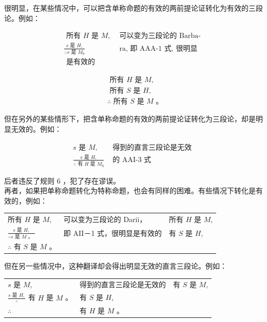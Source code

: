 很明显，在某些情况中，可以把含单称命题的有效的两前提论证转化为有效的三段论。例如：

$$
\begin{array}{ll}
\text { 所有 } H \text { 是 } M, & \text { 可以变为三段论的 Barba- } \\
\frac{s \text { 是 } H,}{\therefore s \text { 是 } M_{0}} & \text { ra, 即 AAA-1 式, 很明显 } \\
\text { 是有效的 } &
\end{array}
$$

$$
\begin{aligned}
& \text { 所有 } H \text { 是 } M, \\
& \text { 所有 } S \text { 是 } H, \\
& \therefore \text { 所有 } S \text { 是 } M \text { 。 }
\end{aligned}
$$

但在另外的某些情形下，把含单称命题的有效的两前提论证转化为三段论，却是明显无效的。例如：

$$
\begin{array}{ll}
s \text { 是 } M, & \text { 得到的直言三段论是无效 } \\
\frac{s \text { 是 } H,}{\therefore \text { 有 } H \text { 是 } M_{0}} & \text { 的 AAI-3 式 }
\end{array}
$$

后者违反了规则 6 ，犯了存在谬误。\\
再者，如果把单称命题转化为特称命题，也会有同样的困难。有些情况下转化是有效的，例如：

\begin{center}
\begin{tabular}{lll}
所有 $H$ 是 $M$, & 可以变为三段论的 Darii， & 所有 $H$ 是 $M$, \\
$\frac{s \text { 是 } H,}{\therefore s \text { 是 } M \text { 。 }}$ & 即 AII－1 式，很明显是有效的 & 有 $S$ 是 $H$, \\
$\therefore$ 有 $S$ 是 $M$ 。 &  &  \\
\end{tabular}
\end{center}

但在另一些情况中，这种翻译却会得出明显无效的直言三段论。例如：

\begin{center}
\begin{tabular}{lll}
$s$ 是 $M$, & 得到的直言三段论是无效的 & 有 $S$ 是 $M$, \\
$\frac{s \text { 是 } H,}{\therefore}$ 有 $H$ 是 $M$ 。 & 有 $S$ 是 $H$, &  \\
$\therefore$ & 有 $H$ 是 $M$ 。 &  \\
\end{tabular}
\end{center}

